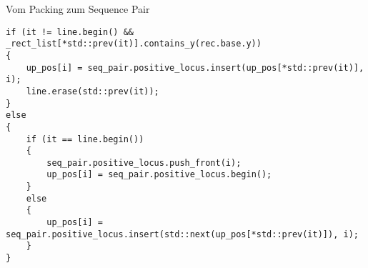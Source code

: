\documentclass{beamer}
\begin{document}
\begin{frame}{Vom Packing zum Sequence Pair}
\begin{figure}
\begin{tikzpicture}[x=5mm,y=5mm]
  
  \end{tikzpicture}
\end{figure}

\end{frame}

\begin{frame}[fragile]
 \begin{lstlisting}[basicstyle=\scriptsize]
if (it != line.begin() && _rect_list[*std::prev(it)].contains_y(rec.base.y))
{
    up_pos[i] = seq_pair.positive_locus.insert(up_pos[*std::prev(it)], i);
    line.erase(std::prev(it));
}
else
{
    if (it == line.begin())
    {
        seq_pair.positive_locus.push_front(i);
        up_pos[i] = seq_pair.positive_locus.begin();
    }
    else
    {
        up_pos[i] = seq_pair.positive_locus.insert(std::next(up_pos[*std::prev(it)]), i);
    }
}
 \end{lstlisting}
\end{frame}
\end{document}
